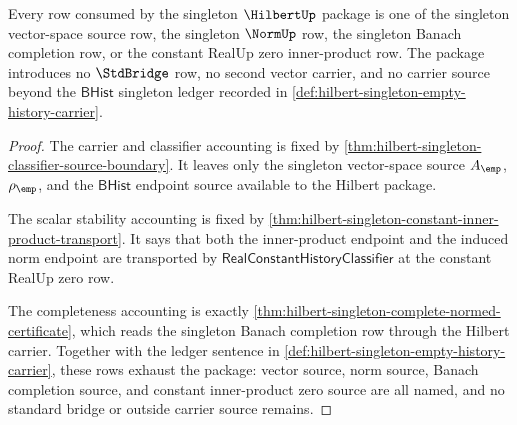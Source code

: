 \begin{theorem}
\label{thm:hilbert-singleton-ledger-exhaustion}
Every row consumed by the singleton $\HilbertUp$ package is one of the
singleton vector-space source row, the singleton $\NormUp$ row, the singleton
Banach completion row, or the constant RealUp zero inner-product row. The
package introduces no $\StdBridge$ row, no second vector carrier, and no
carrier source beyond the $\mathsf{BHist}$ singleton ledger recorded in
\autoref{def:hilbert-singleton-empty-history-carrier}.
\end{theorem}
\begin{proof}
The carrier and classifier accounting is fixed by
\autoref{thm:hilbert-singleton-classifier-source-boundary}. It leaves only
the singleton vector-space source $A_{\emp}$, $\rho_{\emp}$, and the
$\mathsf{BHist}$ endpoint source available to the Hilbert package.

The scalar stability accounting is fixed by
\autoref{thm:hilbert-singleton-constant-inner-product-transport}. It says
that both the inner-product endpoint and the induced norm endpoint are
transported by $\mathsf{RealConstantHistoryClassifier}$ at the constant
RealUp zero row.

The completeness accounting is exactly
\autoref{thm:hilbert-singleton-complete-normed-certificate}, which reads the
singleton Banach completion row through the Hilbert carrier. Together with
the ledger sentence in
\autoref{def:hilbert-singleton-empty-history-carrier}, these rows exhaust the
package: vector source, norm source, Banach completion source, and constant
inner-product zero source are all named, and no standard bridge or outside
carrier source remains.
\end{proof}


